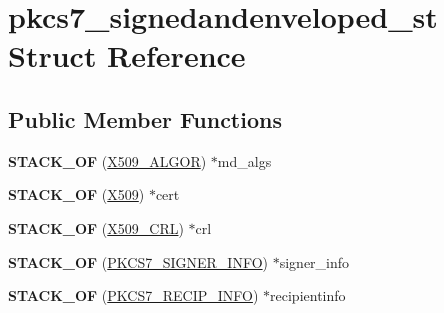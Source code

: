 \hypertarget{structpkcs7__signedandenveloped__st}{}\section{pkcs7\+\_\+signedandenveloped\+\_\+st Struct Reference}
\label{structpkcs7__signedandenveloped__st}
\subsection*{Public Member Functions}
\begin{DoxyCompactItemize}
\item 
\mbox{\label{structpkcs7__signedandenveloped__st_a371965c92590d7c7d5e131a65ef0ea4c}} 
{\bfseries S\+T\+A\+C\+K\+\_\+\+OF} (\hyperlink{struct_x509__algor__st}{X509\+\_\+\+A\+L\+G\+OR}) $\ast$md\+\_\+algs
\item 
\mbox{\label{structpkcs7__signedandenveloped__st_af51fdd4b6d747aa931e5b2c1e7a64750}} 
{\bfseries S\+T\+A\+C\+K\+\_\+\+OF} (\hyperlink{structx509__st}{X509}) $\ast$cert
\item 
\mbox{\label{structpkcs7__signedandenveloped__st_aa349f9695dc03a7db43d8ebdd765120e}} 
{\bfseries S\+T\+A\+C\+K\+\_\+\+OF} (\hyperlink{struct_x509__crl__st}{X509\+\_\+\+C\+RL}) $\ast$crl
\item 
\mbox{\label{structpkcs7__signedandenveloped__st_a00fa5f536ef6fa7dea07597173710ea3}} 
{\bfseries S\+T\+A\+C\+K\+\_\+\+OF} (\hyperlink{structpkcs7__signer__info__st}{P\+K\+C\+S7\+\_\+\+S\+I\+G\+N\+E\+R\+\_\+\+I\+N\+FO}) $\ast$signer\+\_\+info
\item 
\mbox{\label{structpkcs7__signedandenveloped__st_a85b554ac212a0a85f8a13b489cb6e546}} 
{\bfseries S\+T\+A\+C\+K\+\_\+\+OF} (\hyperlink{structpkcs7__recip__info__st}{P\+K\+C\+S7\+\_\+\+R\+E\+C\+I\+P\+\_\+\+I\+N\+FO}) $\ast$recipientinfo
\end{DoxyCompactItemize}
